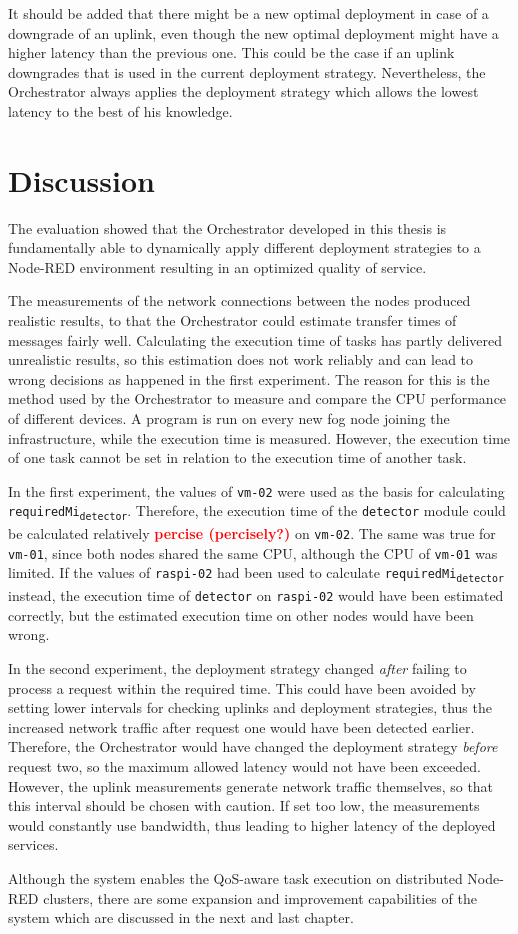 It should be added that there might be a new optimal deployment in case of a downgrade of an uplink, even though the new optimal deployment might have a higher latency than the previous one.
This could be the case if an uplink downgrades that is used in the current deployment strategy.
Nevertheless, the Orchestrator always applies the deployment strategy which allows the lowest latency to the best of his knowledge.



\section{Discussion}

The evaluation showed that the Orchestrator developed in this thesis is fundamentally able to dynamically apply different deployment strategies to a Node-RED environment resulting in an optimized quality of service.

The measurements of the network connections between the nodes produced realistic results, to that the Orchestrator could estimate transfer times of messages fairly well.
Calculating the execution time of tasks has partly delivered unrealistic results, so this estimation does not work reliably and can lead to wrong decisions as happened in the first experiment.
The reason for this is the method used by the Orchestrator to measure and compare the CPU performance of different devices.
A program is run on every new fog node joining the infrastructure, while the execution time is measured.
However, the execution time of one task cannot be set in relation to the execution time of another task.

In the first experiment, the values of \texttt{vm-02} were used as the basis for calculating \texttt{requiredMi\textsubscript{detector}}.
Therefore, the execution time of the \texttt{detector} module could be calculated relatively \textcolor{red}{\textbf{percise (percisely?)}} on \texttt{vm-02}.
The same was true for \texttt{vm-01}, since both nodes shared the same CPU, although the CPU of \texttt{vm-01} was limited.
If the values of \texttt{raspi-02} had been used to calculate \texttt{requiredMi\textsubscript{detector}} instead, the execution time of \texttt{detector} on \texttt{raspi-02} would have been estimated correctly, but the estimated execution time on other nodes would have been wrong.

In the second experiment, the deployment strategy changed \textit{after} failing to process a request within the required time.
This could have been avoided by setting lower intervals for checking uplinks and deployment strategies, thus the increased network traffic after request one would have been detected earlier.
Therefore, the Orchestrator would have changed the deployment strategy \textit{before} request two, so the maximum allowed latency would not have been exceeded.
However, the uplink measurements generate network traffic themselves, so that this interval should be chosen with caution.
If set too low, the measurements would constantly use bandwidth, thus leading to higher latency of the deployed services.

Although the system enables the QoS-aware task execution on distributed Node-RED clusters, there are some expansion and improvement capabilities of the system which are discussed in the next and last chapter.